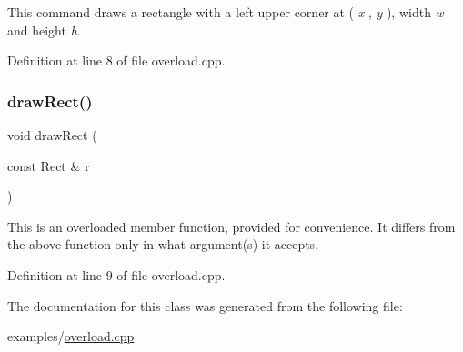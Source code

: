 This command draws a rectangle with a left upper corner at ( {\itshape x} , {\itshape y} ), width {\itshape w} and height {\itshape h}. 

Definition at line 8 of file overload.\+cpp.

\mbox{\label{class_overload___test_ab694ef31f21b39129051d079925cc271}} 
\subsubsection{\texorpdfstring{draw\+Rect()}{drawRect()}\hspace{0.1cm}{\footnotesize\ttfamily [2/2]}}
{\footnotesize\ttfamily void draw\+Rect (\begin{DoxyParamCaption}\item[{const Rect \&}]{r }\end{DoxyParamCaption})}

This is an overloaded member function, provided for convenience. It differs from the above function only in what argument(s) it accepts. 

Definition at line 9 of file overload.\+cpp.



The documentation for this class was generated from the following file\+:\begin{DoxyCompactItemize}
\item 
examples/\hyperlink{overload_8cpp}{overload.\+cpp}\end{DoxyCompactItemize}
